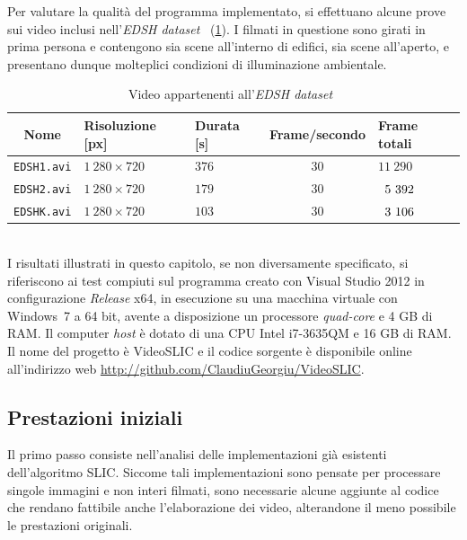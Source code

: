 \documentclass[12pt,a4paper,oneside]{article}
\begin{document}
Per valutare la qualità del programma implementato, si effettuano alcune prove sui video inclusi nell'\textit{EDSH dataset}~\cite{KITANI_HAND_DETECTION} (\cref{EDSH_videos}). I filmati in questione sono girati in prima persona e contengono sia scene all'interno di edifici, sia scene all'aperto, e presentano dunque molteplici condizioni di illuminazione ambientale.
\begin{table}[!htb]
	\renewcommand{\arraystretch}{1.3}
	\centering
	\begin{tabular}{|c||>{\centering\arraybackslash}m{}|>{\centering\arraybackslash}m{}|c|>{\centering\arraybackslash}m{}|}
		\hline
		Nome & Risoluzione [px] & Durata [s] & Frame/secondo & Frame totali\\
		\hline\hline
		\texttt{EDSH1.avi} & $1~280 \times 720$ & $376$ & $30$ & $            11~290$\\\hline
		\texttt{EDSH2.avi} & $1~280 \times 720$ & $179$ & $30$ & $\hspace{.5em}5~392$\\\hline
		\texttt{EDSHK.avi} & $1~280 \times 720$ & $103$ & $30$ & $\hspace{.5em}3~106$\\\hline
	\end{tabular}
	\caption{Video appartenenti all'\textit{EDSH dataset}~\cite{KITANI_HAND_DETECTION}}
	\label{EDSH_videos}
\end{table}
\\\noindent I risultati illustrati in questo capitolo, se non diversamente specificato, si riferiscono ai test compiuti sul programma creato con Visual Studio 2012 in configurazione \textit{Release} x64, in esecuzione su una macchina virtuale con Windows~7 a 64 bit, avente a disposizione un processore \textit{quad-core} e 4 GB di \mbox{RAM}. Il computer \textit{host} è dotato di una CPU Intel i7-3635QM e 16 GB di \mbox{RAM}. Il nome del progetto è VideoSLIC e il codice sorgente è disponibile online all'indirizzo web \url{http://github.com/ClaudiuGeorgiu/VideoSLIC}.

\subsection{Prestazioni iniziali}
Il primo passo consiste nell'analisi delle implementazioni già esistenti dell'algoritmo \gls{SLIC}. Siccome tali implementazioni sono pensate per processare singole immagini e non interi filmati, sono necessarie alcune aggiunte al codice che rendano fattibile anche l'elaborazione dei video, alterandone il meno possibile le prestazioni originali.
\end{document}
